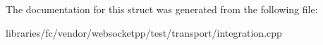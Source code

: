 The documentation for this struct was generated from the following file\+:\begin{DoxyCompactItemize}
\item 
libraries/fc/vendor/websocketpp/test/transport/integration.\+cpp\end{DoxyCompactItemize}
